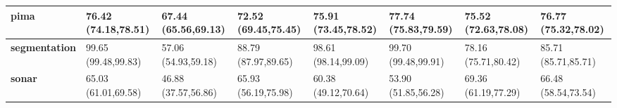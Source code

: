 \documentclass[conference]{IEEEtran}
\begin{document}
\begin{table*}[thpbh]
\begin{adjustbox}{width=1\textwidth}
\begin{tabular}{@{}cccccccc@{}}
			\multicolumn{1}{|l|}{\textbf{pima}}         & \multicolumn{1}{l|}{76.42 (74.18,78.51)} & \multicolumn{1}{l|}{67.44 (65.56,69.13)} & \multicolumn{1}{l|}{72.52 (69.45,75.45)} & \multicolumn{1}{l|}{75.91 (73.45,78.52)}  & \multicolumn{1}{l|}{77.74 (75.83,79.59)}    & \multicolumn{1}{l|}{75.52 (72.63,78.08)}    & \multicolumn{1}{l|}{76.77 (75.32,78.02)}    \\ \midrule
			\multicolumn{1}{|l|}{\textbf{segmentation}} & \multicolumn{1}{l|}{99.65 (99.48,99.83)} & \multicolumn{1}{l|}{57.06 (54.93,59.18)} & \multicolumn{1}{l|}{88.79 (87.97,89.65)} & \multicolumn{1}{l|}{98.61 (98.14,99.09)}  & \multicolumn{1}{l|}{99.70 (99.48,99.91)}    & \multicolumn{1}{l|}{78.16 (75.71,80.42)}    & \multicolumn{1}{l|}{85.71 (85.71,85.71)}    \\ \midrule
			\multicolumn{1}{|l|}{\textbf{sonar}}        & \multicolumn{1}{l|}{65.03 (61.01,69.58)} & \multicolumn{1}{l|}{46.88 (37.57,56.86)} & \multicolumn{1}{l|}{65.93 (56.19,75.98)} & \multicolumn{1}{l|}{60.38 (49.12,70.64)}  & \multicolumn{1}{l|}{53.90 (51.85,56.28)}    & \multicolumn{1}{l|}{69.36 (61.19,77.29)}    & \multicolumn{1}{l|}{66.48 (58.54,73.54)}    \\ \bottomrule
		\end{tabular}
		\end{adjustbox}
	\end{table*}


\end{document}

